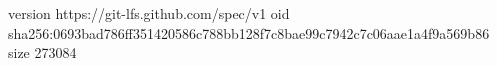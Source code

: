 version https://git-lfs.github.com/spec/v1
oid sha256:0693bad786ff351420586c788bb128f7c8bae99c7942c7c06aae1a4f9a569b86
size 273084
